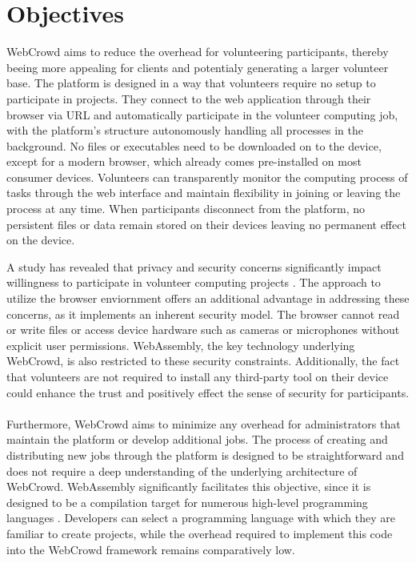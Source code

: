 \section{Objectives}
\label{sec:intro:objectives}
WebCrowd aims to reduce the overhead for volunteering participants, thereby beeing more appealing for clients and potentialy generating a larger volunteer base. The platform is designed in a way that volunteers require no setup to participate in projects. They connect to the web application through their browser via \acs{URL} and automatically participate in the volunteer computing job, with the platform's structure autonomously handling all processes in the background. No files or executables need to be downloaded on to the device, except for a modern browser, which already comes pre-installed on most consumer devices. Volunteers can transparently monitor the computing process of tasks through the web interface and maintain flexibility in joining or leaving the process at any time. When participants disconnect from the platform, no persistent files or data remain stored on their devices leaving no permanent effect on the device.

A study has revealed that privacy and security concerns significantly impact willingness to participate in volunteer computing projects \cite{intro:volunteerStudy}. The approach to utilize the browser enviornment offers an additional advantage in addressing these concerns, as it implements an inherent security model. The browser cannot read or write files or access device hardware such as cameras or microphones without explicit user permissions. WebAssembly, the key technology underlying WebCrowd, is also restricted to these security constraints. Additionally, the fact that volunteers are not required to install any third-party tool on their device could enhance the trust and positively effect the sense of security for participants.
\\~\\
Furthermore, WebCrowd aims to minimize any overhead for administrators that maintain the platform or develop additional jobs. The process of creating and distributing new jobs through the platform is designed to be straightforward and does not require a deep understanding of the underlying architecture of WebCrowd. WebAssembly significantly facilitates this objective, since it is designed to be a compilation target for numerous high-level programming languages \cite{methodology:wasm, methodology:wasmW3C, methodology:wasmdocu, relatedwork:wasmedgecomputing}. Developers can select a programming language with which they are familiar to create projects, while the overhead required to implement this code into the WebCrowd framework remains comparatively low. 

